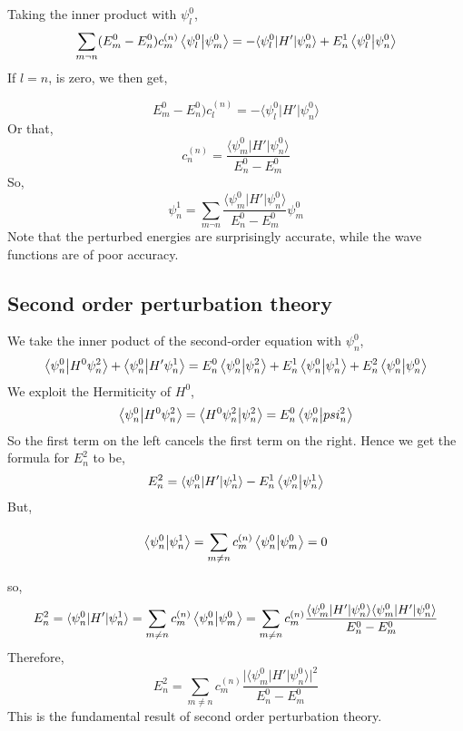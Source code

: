 Taking the inner product with $\psi^0_l$,
\begin{equation}
\sum_{m\neg n}(E^0_m-E^0_n)c^{(n)}_m\braket{\psi^0_l}{\psi^0_m}=-\langle\psi^0_l\vert H' \vert \psi^0_n\rangle+E^1_n\braket{\psi^0_l}{\psi^0_n}
\end{equation}
If $l=n$, is zero, we then get,

\begin{equation}
E^0_m-E^0_n)c^{(n)}_l=-\langle\psi^0_l\vert H' \vert \psi^0_n\rangle
\end{equation}
Or that,
\begin{equation}
c^{(n)}_n=\frac{\langle\psi^0_m\vert H' \vert \psi^0_n\rangle}{E^0_n-E^0_m}
\end{equation}
So,
\begin{equation}
\psi^1_n=\sum_{m\neg n}\frac{\langle\psi^0_m\vert H' \vert \psi^0_n\rangle}{E^0_n-E^0_m}\psi^0_m
\end{equation}
Note that the perturbed energies are surprisingly accurate, while the wave functions are of poor accuracy.


\subsection{Second order perturbation theory}
We take the inner poduct of the second-order equation with $\psi^0_n$,
\begin{equation}
\braket{\psi^0_n}{H^0\psi^2_n}+\braket{\psi^0_n}{H'\psi^1_n}=E^0_n\braket{\psi^0_n}{\psi^2_n}+E^1_n\braket{\psi^0_n}{\psi^1_n}+ E^2_n\braket{\psi^0_n}{\psi^0_n}
\end{equation}
We exploit the Hermiticity of $H^0$,
\begin{equation}
\braket{\psi^0_n}{H^0\psi^2_n}=\braket{H^0\psi^2_n}{\psi^2_n}=E^0_n\braket{\psi^0_n}{psi^2_n}
\end{equation}
So the first term on the left cancels the first term on the right. Hence we get the formula for $E^2_n$ to be,
\begin{equation}
E^2_n=\langle\psi^0_n\vert H' \vert \psi^1_n\rangle - E^1_n\braket{\psi^0_n}{\psi^1_n}
\end{equation}
But,

\begin{equation}
\braket{\psi^0_n}{\psi^1_n}=\sum_{m\neq n}^{}c^{(n)}_m\braket{\psi^0_n}{\psi^0_m}=0
\end{equation}

so,
\begin{equation}
E^2_n=\langle\psi^0_n\vert H' \vert \psi^1_n\rangle=\sum_{m\neq n}^{}c^{(n)}_m\braket{\psi^0_n}{\psi^0_m}= \sum_{m\neq n}^{}c^{(n)}_m\frac{\langle\psi^0_m\vert H' \vert \psi^0_n\rangle \langle\psi^0_m\vert H' \vert \psi^0_n\rangle}{E^0_n-E^0_m}
\end{equation}
Therefore,
\begin{equation}
E^2_n= \sum_{m\neq n}^{}c^{(n)}_m\frac{\vert\langle\psi^0_m\vert H' \vert \psi^0_n\rangle\vert^2}{E^0_n-E^0_m}
\end{equation}
This is the fundamental result of second order perturbation theory.

